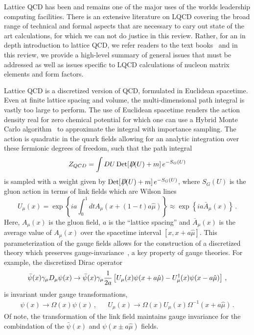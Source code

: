Lattice QCD has been and remains one of the major uses of the worlds leadership computing facilities.
There is an extensive literature on LQCD covering the broad range of technical and formal aspects that are necessary to cary out state of the art calculations, for which we can not do justice in this review.
Rather, for an in depth introduction to lattice QCD, we refer readers to the text books~\cite{Smit:2002ug,DeGrand:2006zz,Gattringer:2010zz} and in this review, we provide a high-level summary of general issues that must be addressed as well as issues specific to LQCD calculations of nucleon matrix elements and form factors.

Lattice QCD is a discretized version of QCD, formulated in Euclidean spacetime.
Even at finite lattice spacing and volume, the multi-dimensional path integral is vastly too large to perform.
The use of Euclidean spacetime renders the action density real for zero chemical potential for which one can use a Hybrid Monte Carlo algorithm~\cite{Duane:1987de} to approximate the integral with importance sampling.
The action is quadratic in the quark fields allowing for an analytic integration over these fermionic degrees of freedom, such that the path integral
\begin{equation}\label{eq:Z_QCD}
Z_{QCD} = \int D U\, {\rm Det}[\Dslash(U) + m]\, e^{-S_G(U)}
\end{equation}
is sampled with a weight given by ${\rm Det}[D\hskip-0.65em /(U) + m]\, e^{-S_G(U)}$, where $S_G(U)$ is the gluon action in terms of link fields which are Wilson lines
\begin{equation}
U_\mu(x) = \exp\left\{i a\int_0^1 dt A_\mu(x +(1-t)a\hat{\mu}) \right\}
    \approx \exp\left\{i a \bar{A}_\mu(x) \right\}\, .
\end{equation}
Here, $A_\mu(x)$ is the gluon field, $a$ is the ``lattice spacing'' and $\bar{A}_\mu(x)$ is the average value of $A_\mu(x)$ over the spacetime interval $[x, x+a\hat{\mu}]$.
This parameterization of the gauge fields allows for the construction of a discretized theory which preserves gauge-invariance~\cite{Wilson:1974sk}, a key property of gauge theories.
For example, the discretized Dirac operator
\begin{equation}\label{eq:naive_fermions}
\bar{\psi}(x)\g_\mu D_\mu \psi(x) \rightarrow
\bar{\psi}(x)\g_\mu\frac{1}{2a}\left[U_\mu(x)\psi(x+a\hat{\mu}) -U^\dagger_\mu(x)\psi(x-a\hat{\mu}) \right]\, ,
\end{equation}
is invariant under gauge transformations,
\begin{align}
&\psi(x)\rightarrow \Omega(x)\psi(x)\, ,&
&U_\mu(x)\rightarrow \Omega(x)U_\mu(x)\Omega^{-1}(x+a\hat{\mu})\, .&
\end{align}
Of note, the transformation of the link field maintains gauge invariance for the combindation of the $\bar{\psi}(x)$ and $\psi(x\pm a\hat{\mu})$ fields.


